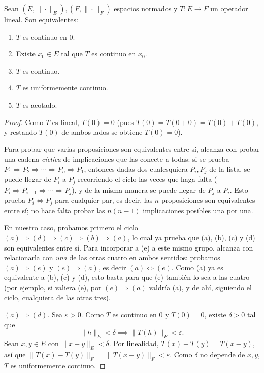 \begin{teo}
Sean $(E,\|\cdot\|_E),(F,\|\cdot\|_F)$ espacios normados y
$T:E\to F$ un operador lineal. Son equivalentes:
\begin{enumerate}[label=(\alph*)]
    \item $T$ es continuo en $0$.
    \item Existe $x_0\in E$ tal que $T$ es continuo en $x_0$.
    \item $T$ es continuo.
    \item $T$ es uniformemente continuo.
    \item $T$ es acotado.
\end{enumerate}
\end{teo}

\begin{proof}
Como $T$ es lineal, $T(0)=0$ (pues $T(0)=T(0+0)=T(0)+T(0)$, y restando
$T(0)$ de ambos lados se obtiene $T(0)=0$).

Para probar que varias proposiciones son equivalentes entre sí, alcanza
con probar una cadena \emph{cíclica} de implicaciones que las conecte a
todas: si se prueba $P_1\Rightarrow P_2 \Rightarrow \cdots \Rightarrow
P_n \Rightarrow P_1$, entonces dadas dos cualesquiera $P_i,P_j$ de la
lista, se puede llegar de $P_i$ a $P_j$ recorriendo el ciclo las veces
que haga falta ($P_i\Rightarrow P_{i+1}\Rightarrow\cdots\Rightarrow
P_j$), y de la misma manera se puede llegar de $P_j$ a $P_i$. Esto
prueba $P_i\Leftrightarrow P_j$ para cualquier par, es decir, las $n$
proposiciones son equivalentes entre sí; no hace falta probar las
$n(n-1)$ implicaciones posibles una por una.

En nuestro caso, probamos primero el ciclo $(a)\Rightarrow(d)
\Rightarrow(c)\Rightarrow(b)\Rightarrow(a)$, lo cual ya prueba que (a),
(b), (c) y (d) son equivalentes entre sí. Para incorporar a (e) a este
mismo grupo, alcanza con relacionarla con \emph{una} de las otras
cuatro en ambos sentidos: probamos $(a)\Rightarrow(e)$ y
$(e)\Rightarrow(a)$, es decir $(a)\Leftrightarrow(e)$. Como (a) ya es
equivalente a (b), (c) y (d), esto basta para que (e) también lo sea a
las cuatro (por ejemplo, si valiera (e), por $(e)\Rightarrow(a)$
valdría (a), y de ahí, siguiendo el ciclo, cualquiera de las otras
tres).

\medskip

$(a)\Rightarrow(d)$. Sea $\varepsilon>0$. Como $T$ es continuo en $0$ y
$T(0)=0$, existe $\delta>0$ tal que
\[
\|h\|_E<\delta \implies \|T(h)\|_F<\varepsilon.
\]
Sean $x,y\in E$ con $\|x-y\|_E<\delta$. Por linealidad,
$T(x)-T(y)=T(x-y)$, así que $\|T(x)-T(y)\|_F=\|T(x-y)\|_F<\varepsilon$.
Como $\delta$ no depende de $x,y$, $T$ es uniformemente continuo.


\end{proof}

